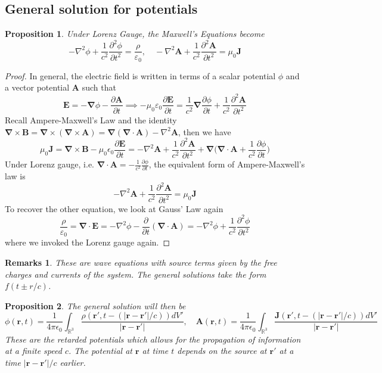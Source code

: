 \documentclass[a4paper]{article}
\newtheorem{remarks}{Remarks}[section]
\theoremstyle{new}
\newtheorem{prop}{Proposition}[section]
\begin{document}
\subsection{General solution for potentials}
\begin{prop}
Under Lorenz Gauge, the Maxwell's Equations become
$$-\nabla^2\phi+\frac{1}{c^2}\frac{\partial^2\phi}{\partial t^2}=\frac{\rho}{\varepsilon_0},\quad-\nabla^2\mathbf{A}+\frac{1}{c^2}\frac{\partial^2\mathbf{A}}{\partial t^2}=\mu_0\mathbf{J}$$
\end{prop}
\begin{proof}
In general, the electric field is written in terms of a scalar potential $\phi$ and a vector potential $\mathbf{A}$ such that
$$\mathbf{E}=-\boldsymbol{\nabla}\phi-\frac{\partial\mathbf{A}}{\partial t}\implies-\mu_0\varepsilon_0\frac{\partial\mathbf{E}}{\partial t}=\frac{1}{c^2}\boldsymbol{\nabla}\frac{\partial\phi}{\partial t}+\frac{1}{c^2}\frac{\partial^2\mathbf{A}}{\partial t^2}$$
Recall Ampere-Maxwell's Law and the identity $\boldsymbol{\nabla}\times\mathbf{B}=\boldsymbol{\nabla}\times(\boldsymbol{\nabla}\times\mathbf{A})=\boldsymbol{\nabla}(\boldsymbol{\nabla}\cdot\mathbf{A})-\nabla^2\mathbf{A}$, then we have
$$\mu_0\mathbf{J}=\boldsymbol{\nabla}\times\mathbf{B}-\mu_0\epsilon_0\frac{\partial\mathbf{E}}{\partial t}=-\nabla^2\mathbf{A}+\frac{1}{c^2}\frac{\partial^2\mathbf{A}}{\partial t^2}+\boldsymbol{\nabla}\bigg(\boldsymbol{\nabla}\cdot\mathbf{A}+\frac{1}{c^2}\frac{\partial\phi}{\partial t}\bigg)$$
Under Lorenz gauge, i.e. $\boldsymbol{\nabla}\cdot\mathbf{A}=-\frac{1}{c^2}\frac{\partial\phi}{\partial t}$, the equivalent form of Ampere-Maxwell's law is
$$-\nabla^2\mathbf{A}+\frac{1}{c^2}\frac{\partial^2\mathbf{A}}{\partial t^2}=\mu_0\mathbf{J}$$
To recover the other equation, we look at Gauss' Law again
$$\frac{\rho}{\varepsilon_0}=\boldsymbol{\nabla}\cdot\mathbf{E}=-\nabla^2\phi-\frac{\partial}{\partial t}(\boldsymbol{\nabla}\cdot\mathbf{A})=-\nabla^2\phi+\frac{1}{c^2}\frac{\partial^2\phi}{\partial t^2}$$
where we invoked the Lorenz gauge again.
\end{proof}
\begin{remarks}
These are wave equations with source terms given by the free charges and currents of the system. The general solutions take the form $f(t\pm r/c)$.
\end{remarks}
\begin{prop}
The general solution will then be
$$\phi(\mathbf{r},t)=\frac{1}{4\pi\epsilon_0}\int_{\mathbb{R}^3}\frac{\rho(\mathbf{r'},t-(|\mathbf{r}-\mathbf{r'}|/c))dV'}{|\mathbf{r}-\mathbf{r'}|},\quad \mathbf{A}(\mathbf{r},t)=\frac{1}{4\pi\epsilon_0}\int_{\mathbb{R}^3}\frac{\mathbf{J}(\mathbf{r'},t-(|\mathbf{r}-\mathbf{r'}|/c))dV'}{|\mathbf{r}-\mathbf{r'}|}$$
These are the retarded potentials which allows for the propagation of information at a finite speed $c$. The potential at $\mathbf{r}$ at time $t$ depends on the source at $\mathbf{r'}$ at a time $|\mathbf{r}-\mathbf{r'}|/c$ earlier.
\end{prop}
\end{document}
